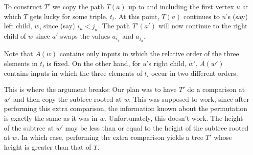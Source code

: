 \documentclass{patmorin}
\begin{document}
To construct $T'$ we copy the path $T(a)$ up to and including the first
vertex $u$ at which $T$ gets lucky for some triple, $t_i$.  At this
point, $T(a)$ continues to $u$'s (say) left child, $w$, since (say) $i_u
< j_u$.  The path $T'(a')$ will now continue to the right child of $w$ since
$a'$ swaps the values $a_{i_u}$ and $a_{j_u}$.

Note that $A(w)$ contains only inputs in which the relative order of the
three elements in $t_i$ is fixed.  On the other hand, for $u$'s right
child, $w'$, $A(w')$ contains inputs in which the three elements of $t_i$
occur in two different orders.

This is where the argument breaks: Our plan was to have $T'$ do a
comparison at $w'$ and then copy the subtree rooted at $w$.  This was
supposed to work, since after performing this extra comparison, the
information known about the permutation is exactly the same as it was
in $w$.  Unfortunately, this doesn't work.  The height of the subtree at
$w'$ may be less than or equal to the height of the subtree rooted at $w$.
In which case, performing the extra comparison yields a tree $T'$ whose
height is greater than that of $T$.
\end{document}
